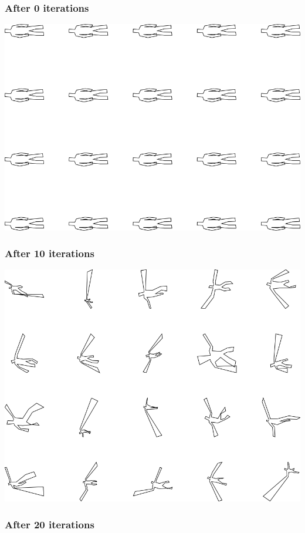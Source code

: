 \subsubsection{After 0 iterations}

\includegraphics[width=6in]{output/3.learning/concentration/concentration_psw1000_iter0_.png}
\subsubsection{After 10 iterations}

\includegraphics[width=6in]{output/3.learning/concentration/concentration_psw1000_iter10_.png}
\subsubsection{After 20 iterations}

